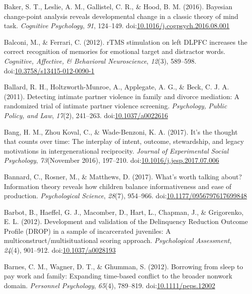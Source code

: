 \documentclass[english,man]{apa6}
\theoremstyle{definition}
\theoremstyle{definition}
\theoremstyle{definition}
\theoremstyle{remark}
\begin{document}
\hypertarget{ref-Baker2016}{}
Baker, S. T., Leslie, A. M., Gallistel, C. R., \& Hood, B. M. (2016).
Bayesian change-point analysis reveals developmental change in a classic
theory of mind task. \emph{Cognitive Psychology}, \emph{91}, 124--149.
doi:\href{https://doi.org/10.1016/j.cogpsych.2016.08.001}{10.1016/j.cogpsych.2016.08.001}

\hypertarget{ref-Balconi2012}{}
Balconi, M., \& Ferrari, C. (2012). rTMS stimulation on left DLPFC
increases the correct recognition of memories for emotional target and
distractor words. \emph{Cognitive, Affective, \& Behavioral
Neuroscience}, \emph{12}(3), 589--598.
doi:\href{https://doi.org/10.3758/s13415-012-0090-1}{10.3758/s13415-012-0090-1}

\hypertarget{ref-Ballard2011}{}
Ballard, R. H., Holtzworth-Munroe, A., Applegate, A. G., \& Beck, C. J.
A. (2011). Detecting intimate partner violence in family and divorce
mediation: A randomized trial of intimate partner violence screening.
\emph{Psychology, Public Policy, and Law}, \emph{17}(2), 241--263.
doi:\href{https://doi.org/10.1037/a0022616}{10.1037/a0022616}

\hypertarget{ref-Bang2017}{}
Bang, H. M., Zhou Koval, C., \& Wade-Benzoni, K. A. (2017). It's the
thought that counts over time: The interplay of intent, outcome,
stewardship, and legacy motivations in intergenerational reciprocity.
\emph{Journal of Experimental Social Psychology}, \emph{73}(November
2016), 197--210.
doi:\href{https://doi.org/10.1016/j.jesp.2017.07.006}{10.1016/j.jesp.2017.07.006}

\hypertarget{ref-Bannard2017}{}
Bannard, C., Rosner, M., \& Matthews, D. (2017). What's worth talking
about? Information theory reveals how children balance informativeness
and ease of production. \emph{Psychological Science}, \emph{28}(7),
954--966.
doi:\href{https://doi.org/10.1177/0956797617699848}{10.1177/0956797617699848}

\hypertarget{ref-Barbot2012}{}
Barbot, B., Haeffel, G. J., Macomber, D., Hart, L., Chapman, J., \&
Grigorenko, E. L. (2012). Development and validation of the Delinquency
Reduction Outcome Profile (DROP) in a sample of incarcerated juveniles:
A multiconstruct/multisituational scoring approach. \emph{Psychological
Assessment}, \emph{24}(4), 901--912.
doi:\href{https://doi.org/10.1037/a0028193}{10.1037/a0028193}

\hypertarget{ref-Barnes2012}{}
Barnes, C. M., Wagner, D. T., \& Ghumman, S. (2012). Borrowing from
sleep to pay work and family: Expanding time-based conflict to the
broader nonwork domain. \emph{Personnel Psychology}, \emph{65}(4),
789--819.
doi:\href{https://doi.org/10.1111/peps.12002}{10.1111/peps.12002}
\end{document}
